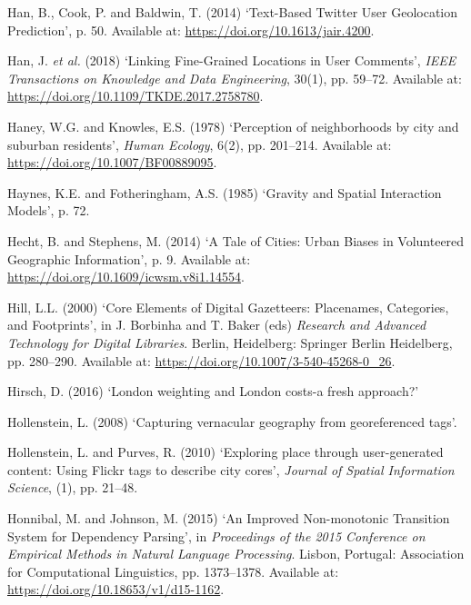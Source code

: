\documentclass[
  letterpaper,
  11pt,
  english,
  onehalfspacing,
  headsepline]{MastersDoctoralThesis}
\newlength{\cslhangindent}
\newlength{\cslentryspacingunit} %
\newenvironment{CSLReferences}[2] %
 {%
  \setlength{\parindent}{0pt}
  \ifodd #1
  \let\oldpar\par
  \def\par{\hangindent=\cslhangindent\oldpar}
  \fi
  \setlength{\parskip}{#2\cslentryspacingunit}
 }%
 {}
\begin{document}
\begin{CSLReferences}{0}{0}
\leavevmode{}%
Han, B., Cook, P. and Baldwin, T. (2014) {`Text-{Based Twitter User
Geolocation Prediction}'}, p. 50. Available at:
\url{https://doi.org/10.1613/jair.4200}.

\leavevmode{}%
Han, J. \emph{et al.} (2018) {`Linking {Fine-Grained Locations} in {User
Comments}'}, \emph{IEEE Transactions on Knowledge and Data Engineering},
30(1), pp. 59--72. Available at:
\url{https://doi.org/10.1109/TKDE.2017.2758780}.

\leavevmode{}%
Haney, W.G. and Knowles, E.S. (1978) {`Perception of neighborhoods by
city and suburban residents'}, \emph{Human Ecology}, 6(2), pp. 201--214.
Available at: \url{https://doi.org/10.1007/BF00889095}.

\leavevmode{}%
Haynes, K.E. and Fotheringham, A.S. (1985) {`Gravity and {Spatial
Interaction Models}'}, p. 72.

\leavevmode{}%
Hecht, B. and Stephens, M. (2014) {`A {Tale} of {Cities}: {Urban Biases}
in {Volunteered Geographic Information}'}, p. 9. Available at:
\url{https://doi.org/10.1609/icwsm.v8i1.14554}.

\leavevmode{}%
Hill, L.L. (2000) {`Core {Elements} of {Digital Gazetteers}:
{Placenames}, {Categories}, and {Footprints}'}, in J. Borbinha and T.
Baker (eds) \emph{Research and {Advanced Technology} for {Digital
Libraries}}. {Berlin, Heidelberg}: {Springer Berlin Heidelberg}, pp.
280--290. Available at: \url{https://doi.org/10.1007/3-540-45268-0_26}.

\leavevmode{}%
Hirsch, D. (2016) {`London weighting and {London} costs-a fresh
approach?'}

\leavevmode{}%
Hollenstein, L. (2008) {`Capturing vernacular geography from
georeferenced tags'}.

\leavevmode{}%
Hollenstein, L. and Purves, R. (2010) {`Exploring place through
user-generated content: {Using Flickr} tags to describe city cores'},
\emph{Journal of Spatial Information Science}, (1), pp. 21--48.

\leavevmode{}%
Honnibal, M. and Johnson, M. (2015) {`An {Improved Non-monotonic
Transition System} for {Dependency Parsing}'}, in \emph{Proceedings of
the 2015 {Conference} on {Empirical Methods} in {Natural Language
Processing}}. {Lisbon, Portugal}: {Association for Computational
Linguistics}, pp. 1373--1378. Available at:
\url{https://doi.org/10.18653/v1/d15-1162}.


\end{CSLReferences}
\end{document}
